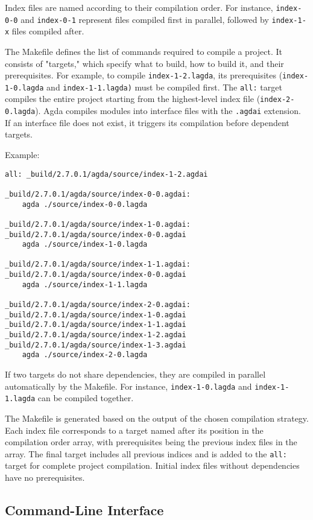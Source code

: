 Index files are named according to their compilation order. For instance,
\texttt{index-0-0} and \texttt{index-0-1} represent files compiled first in parallel, followed by
\texttt{index-1-x} files compiled after. 

The Makefile defines the list of commands required to compile a project. It
consists of "targets," which specify what to build, how to build it, and their
prerequisites. For example, to compile \texttt{index-1-2.lagda}, its
prerequisites (\texttt{index-1-0.lagda} and \texttt{index-1-1.lagda)} must be
compiled first. The \texttt{all:} target compiles the entire project starting
from the highest-level index file (\texttt{index-2-0.lagda}). Agda compiles
modules into interface files with the \texttt{.agdai} extension. If an
interface file does not exist, it triggers its compilation
before dependent targets.

Example:

\begin{lstlisting}
all: _build/2.7.0.1/agda/source/index-1-2.agdai 

_build/2.7.0.1/agda/source/index-0-0.agdai: 
	agda ./source/index-0-0.lagda

_build/2.7.0.1/agda/source/index-1-0.agdai: _build/2.7.0.1/agda/source/index-0-0.agdai 
	agda ./source/index-1-0.lagda

_build/2.7.0.1/agda/source/index-1-1.agdai: _build/2.7.0.1/agda/source/index-0-0.agdai 
	agda ./source/index-1-1.lagda

_build/2.7.0.1/agda/source/index-2-0.agdai: _build/2.7.0.1/agda/source/index-1-0.agdai _build/2.7.0.1/agda/source/index-1-1.agdai _build/2.7.0.1/agda/source/index-1-2.agdai _build/2.7.0.1/agda/source/index-1-3.agdai 
	agda ./source/index-2-0.lagda
\end{lstlisting}

If two targets do not share dependencies, they are compiled in parallel
automatically by the Makefile. For instance, \texttt{index-1-0.lagda}
and \texttt{index-1-1.lagda} can be compiled together.

The Makefile is generated based on the output of the chosen compilation
strategy. Each index file corresponds to a target named after its position in
the compilation order array, with prerequisites being the previous index
files in the array. The final target includes all previous indices and is added
to the \texttt{all:} target for complete project compilation. Initial index files
without dependencies have no prerequisites.

\subsection{Command-Line Interface}


